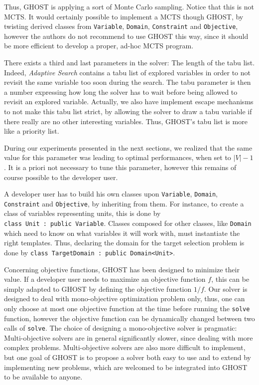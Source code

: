 \documentclass[journal]{IEEEtran}
\newcommand{\ghost}{\textsc{GHOST}\xspace}
\begin{document}
Thus, \ghost is  applying a sort of Monte Carlo  sampling. Notice that
this is  not MCTS.  It  would certainly  possible to implement  a MCTS
though  \ghost, by  twisting derived  classes from  \texttt{Variable},
\texttt{Domain},  \texttt{Constraint} and  \texttt{Objective}, however
the authors do  not recommend to use \ghost this  way, since it should
be more efficient to develop a proper, ad-hoc MCTS program.

There exists a third and last  parameters in the solver: The length of
the tabu list.  Indeed, {\it Adaptive  Search} contains a tabu list of
explored variables in order to not  revisit the same variable too soon
during the search. The tabu parameter  is then a number expressing how
long  the solver  has  to  wait before  being  allowed  to revisit  an
explored variable. Actually, we  also have implement escape mechanisms
to not make  this tabu list strict,  by allowing the solver  to draw a
tabu   variable   if   there   really   are   no   other   interesting
variables. Thus, \ghost's tabu list is more like a priority list.

During our  experiments presented  in the  next sections,  we realized
that  the  same  value  for  this parameter  was  leading  to  optimal
performances, when  set to $|V|-1$.  It  is a priori not  necessary to
tune this  parameter, however this  remains of course possible  to the
developer user.

A developer user has to  build his own classes upon \texttt{Variable},
\texttt{Domain},   \texttt{Constraint}   and  \texttt{Objective},   by
inheriting from  them. For  instance, to create  a class  of variables
representing        units,        this        is        done        by
\texttt{class~Unit~:~public~Variable}.   Classes  composed  for  other
classes, like \texttt{Domain} which need  to know on what variables it
will work with, must instantiate  the right templates. Thus, declaring
the   domain   for  the   target   selection   problem  is   done   by
\texttt{class~TargetDomain~:~public~Domain<Unit>}.

Concerning objective  functions, \ghost has been  designed to minimize
their  value.  If  a developer  user  needs to  maximize an  objective
function $f$,  this can be  simply adapted  to \ghost by  defining the
objective  function  $1/f$.   Our  solver is  designed  to  deal  with
mono-objective optimization problem only, thus, one can only choose at
most  one   objective  function  at   the  time  before   running  the
\texttt{solve}  function,  however  the   objective  function  can  be
dynamically changed between two calls of \texttt{solve}. The choice of
designing  a  mono-objective   solver  is  pragmatic:  Multi-objective
solvers are in  general significantly slower, since  dealing with more
complex problems.  Multi-objective solvers  are also more difficult to
implement, but one goal of \ghost is  to propose a solver both easy to
use and to extend by implementing  new problems, which are welcomed to
be integrated into \ghost to be available to anyone.
\end{document}
